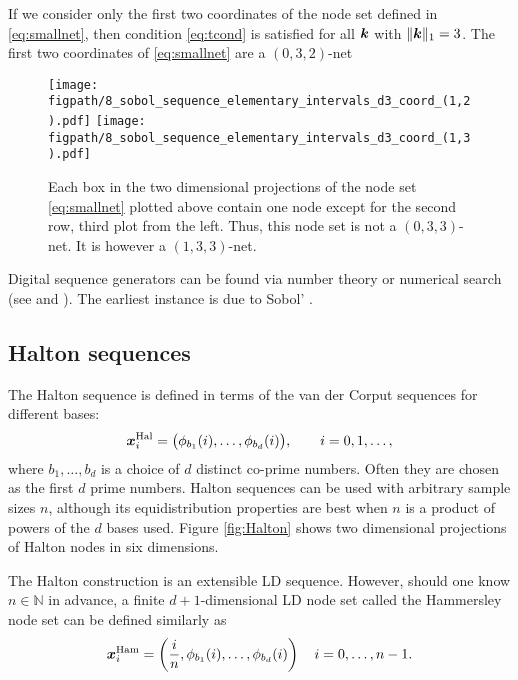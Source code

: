 \documentclass{svproc}
\newcommand{\figpath}{Figures}
\begin{document}
If we consider only the first two coordinates of the node set defined in \eqref{eq:smallnet}, then  condition \eqref{eq:tcond} is satisfied for all ${\boldsymbol{k}}$ with $\lVert {\boldsymbol{k}} \rVert_1 = 3$.  The first two coordinates of \eqref{eq:smallnet} are a $(0,3,2)$-net



\begin{figure}
	\centering
	\texttt{[image: \\figpath/8\_sobol\_sequence\_elementary\_intervals\_d3\_coord\_(1,2).pdf]}
	\texttt{[image: \\figpath/8\_sobol\_sequence\_elementary\_intervals\_d3\_coord\_(1,3).pdf]}
	\caption{Each box in the two dimensional projections of the node set \eqref{eq:smallnet} plotted above contain one node except for the second row, third plot from the left.  Thus, this node set is not a $(0,3,3)$-net.  It is however a $(1,3,3)$-net.  \label{fig:elementinterval}}
\end{figure}



Digital sequence generators can be found via number theory \cite[Chapter 8]{DicPil10a} or numerical search (see \cite{KuoJoe08a} and \cite[Chapter 10]{DicPil10a}).  The earliest instance is due to Sobol' \cite{Sob67}. %


\subsection{Halton sequences} \label{sec:Halton} 
The Halton sequence is defined in terms of the van der Corput sequences for different bases:
\begin{equation}\label{eq:Halton}
	{\boldsymbol{x}}^{\text{Hal}}_i = \bigl( \phi_{b_1}(i), \ldots, \phi_{b_d}(i) \bigr), \qquad i = 0, 1, \ldots,
\end{equation}
where $b_1, \ldots, b_d$ is a choice of $d$ distinct co-prime numbers.  Often they are chosen as the first $d$ prime numbers. Halton sequences can be used with arbitrary sample sizes \( n \), although its equidistribution properties are best when \( n \) is a product of powers of the \( d \) bases used. Figure \ref{fig:Halton} shows two dimensional projections of Halton nodes in six dimensions. 

The Halton construction is an extensible LD sequence. However, should one know $n \in \mathbb{N}$ in advance, a finite $d+1$-dimensional LD node set called the Hammersley node set can be defined similarly as
\begin{equation}\label{eq:hammersley}
    {\boldsymbol{x}}_i^{\text{Ham}} = \left( \frac{i}{n}, \phi_{b_1}(i), \ldots, \phi_{b_d}(i) \right) \quad i = 0, \ldots, n-1.
\end{equation}
\end{document}
